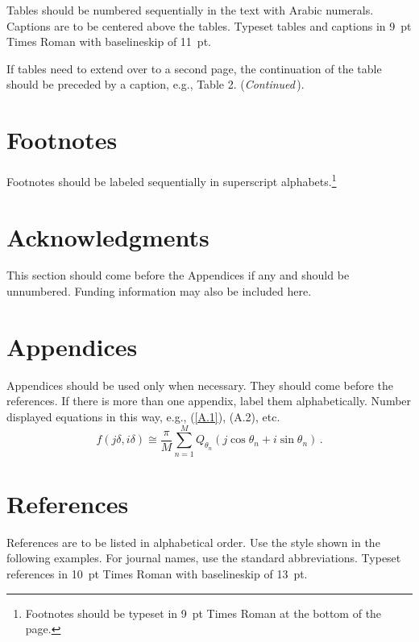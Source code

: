\documentclass{ws-join}
\begin{document}
Tables should be numbered sequentially in the text with Arabic
numerals. Captions are to be centered above the tables.
Typeset tables and captions in 9~pt Times Roman with
baselineskip of 11~pt.

If tables need to extend over to a second page, the continuation
of the table should be preceded by a caption, e.g., Table 2.
({\it Continued}\,).

\section{Footnotes}
Footnotes should be labeled sequentially in superscript
alphabets.\footnote{Footnotes should be typeset in 9~pt
Times Roman at the bottom of the page.}

\section*{Acknowledgments}
This section should come before the Appendices if any and should
be unnumbered. Funding information may also be included here.

\appendix

\section{Appendices}

\noindent
Appendices should be used only when necessary. They should come 
before the references. If there is more than one appendix, label 
them alphabetically. Number displayed equations in this way, e.g., 
(\ref{A.1}), (A.2), etc.
\begin{equation}
f(j\delta, i\delta) \cong \frac{\pi}{M} \sum^M_{n=1}
Q_{\theta_n} (j \cos \theta_n + i \sin \theta_n)\, .\label{A.1}
\end{equation}

\section*{References}

References are to be listed in alphabetical order. Use
the style shown in the following examples. For journal names,
use the standard abbreviations. Typeset references in 10~pt Times
Roman with baselineskip of 13~pt.
\end{document}
